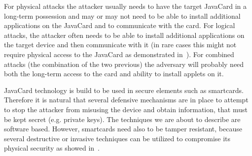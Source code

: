 \documentclass{../llncs/llncs}
\begin{document}
        For physical attacks the attacker usually needs to have the target JavaCard in a long-term possession and may or may not need to be able to install additional applications on the JavaCard and to communicate with the card. For logical attacks, the attacker often needs to be able to install additional applications on the target device and then communicate with it (in rare cases this might not require physical access to the JavaCard as demonstrated in~\cite{se:gemalto:part2}). For combined attacks (the combination of the two previous) the adversary will probably need both the long-term access to the card and ability to install applets on it.

        JavaCard technology is build to be used in secure elements such as smartcards. Therefore it is natural that several defensive mechanisms are in place to attempt to stop the attacker from misusing the device and obtain information, that must be kept secret (e.g. private keys).
The techniques we are about to describe are software based. However, smartcards need also to be tamper resistant, because several destructive or invasive techniques can be utilized to compromise its physical security as showed in~\cite{kommerling}.

\end{document}
